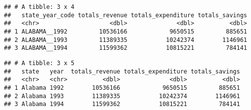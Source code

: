 \documentclass[
]{article}
\newenvironment{Shaded}{\begin{snugshade}}{\end{snugshade}}
\newcommand{\AttributeTok}[1]{\textcolor[rgb]{0.77,0.63,0.00}{#1}}
\newcommand{\CommentTok}[1]{\textcolor[rgb]{0.56,0.35,0.01}{\textit{#1}}}
\newcommand{\DecValTok}[1]{\textcolor[rgb]{0.00,0.00,0.81}{#1}}
\newcommand{\FunctionTok}[1]{\textcolor[rgb]{0.00,0.00,0.00}{#1}}
\newcommand{\NormalTok}[1]{#1}
\newcommand{\OtherTok}[1]{\textcolor[rgb]{0.56,0.35,0.01}{#1}}
\newcommand{\SpecialCharTok}[1]{\textcolor[rgb]{0.00,0.00,0.00}{#1}}
\newcommand{\StringTok}[1]{\textcolor[rgb]{0.31,0.60,0.02}{#1}}
\begin{document}
\begin{verbatim}
## # A tibble: 3 x 4
##   state_year_code totals_revenue totals_expenditure totals_savings
##   <chr>                    <dbl>              <dbl>          <dbl>
## 1 ALABAMA__1992         10536166            9650515         885651
## 2 ALABAMA__1993         11389335           10242374        1146961
## 3 ALABAMA__1994         11599362           10815221         784141
\end{verbatim}

\begin{Shaded}
\end{Shaded}

\begin{verbatim}
## # A tibble: 3 x 5
##   state   year  totals_revenue totals_expenditure totals_savings
##   <chr>   <chr>          <dbl>              <dbl>          <dbl>
## 1 Alabama 1992        10536166            9650515         885651
## 2 Alabama 1993        11389335           10242374        1146961
## 3 Alabama 1994        11599362           10815221         784141
\end{verbatim}
\end{document}
